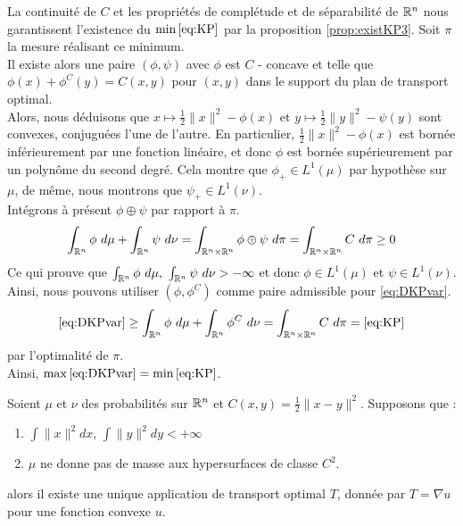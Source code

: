 \documentclass[a4paper,12pt]{article}
\begin{document}
\begin{preuve}
La continuité de $C$ et les propriétés de complétude et de séparabilité de $\mathbb{R}^n$ nous garantissent l'existence du $\min\eqref{eq:KP}$ par la proposition \eqref{prop:existKP3}. Soit $\pi$ la mesure réalisant ce minimum. \\

Il existe alors une paire $(\phi,\psi)$ avec $\phi$ est $C$ - concave et telle que $\phi(x)+\phi^C(y) = C(x,y)$ pour $(x,y)$ dans le support du plan de transport optimal.\\

Alors, nous déduisons que $x\mapsto\frac{1}{2}\|x\|^2-\phi(x)$ et $y\mapsto\frac{1}{2}\|y\|^2-\psi(y)$ sont convexes, conjuguées l'une de l'autre. En particulier, $\frac{1}{2}\|x\|^2-\phi(x)$ est bornée inférieurement par une fonction linéaire, et donc $\phi$ est bornée supérieurement par un polynôme du second degré. Cela montre que $\phi_+\in L^1(\mu)$ par hypothèse sur $\mu$, de même, nous montrons que $\psi_+\in L^1(\nu)$. \\
Intégrons à présent $\phi\oplus\psi$ par rapport à $\pi$. 
$$
\int_{\RR^n}\phi\ d\mu + \int_{\RR^n}\psi\ d\nu = \int_{\RR^n\times\RR^n}\phi\oplus\psi\ d\pi = \int_{\RR^n\times\RR^n}C\ d\pi \geq 0
$$
Ce qui prouve que $\int_{\mathbb{R}^n}\phi\ d\mu,\ \int_{\mathbb{R}^n}\psi\ d\nu > -\infty$ et donc $\phi\in L^1(\mu)$ et $\psi \in L^1(\nu)$.\\

Ainsi, nous pouvons utiliser $(\phi,\phi^C)$ comme paire admissible pour \eqref{eq:DKPvar}. 
$$
\eqref{eq:DKPvar} \geq \int_{\RR^n}\phi\ d\mu + \int_{\RR^n}\phi^C\ d\nu = \int_{\RR^n\times\RR^n}C\ d\pi = \eqref{eq:KP}
$$
par l'optimalité de $\pi$. \\
Ainsi, $\max\eqref{eq:DKPvar} = \min\eqref{eq:KP}$. 
\end{preuve}


\begin{theoreme}{}
Soient $\mu$ et $\nu$ des probabilités sur $\mathbb{R}^n$ et $C(x,y)=\frac{1}{2}\|x-y\|^2$. Supposons que : 
\begin{enumerate}
\item $\int\|x\|^2dx$, $\int\|y\|^2dy<+\infty$
\item $\mu$ ne donne pas de masse aux hypersurfaces de classe $C^2$.
\end{enumerate}
alors il existe une unique application de transport optimal $T$, donnée par $T=\nabla u$ pour une fonction convexe $u$.
\end{theoreme}
\end{document}
